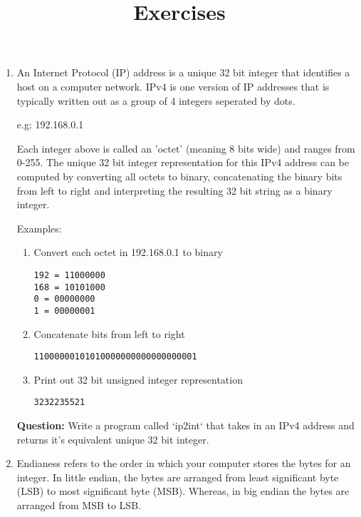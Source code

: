 \documentclass{article}
\title{Exercises \vspace{-4ex}}
\date{}
\begin{document}
\maketitle
\begin{enumerate}
  \item An Internet Protocol (IP) address is a unique 32 bit integer that identifies a
        host on a computer network. IPv4 is one version of IP addresses that is
        typically written out as a group of 4 integers seperated by dots.

        e.g: 192.168.0.1

        Each integer above is called an 'octet' (meaning 8 bits wide) and ranges from
        0-255. The unique 32 bit integer representation for this IPv4 address can be
        computed by converting all octets to binary, concatenating the binary bits from
        left to right and interpreting the resulting 32 bit string as a binary integer.

        Examples:
        \begin{enumerate}
          \item Convert each octet in 192.168.0.1 to binary
                \begin{verbatim}
192 = 11000000 
168 = 10101000 
0 = 00000000 
1 = 00000001
        \end{verbatim}

          \item Concatenate bits from left to right

                \begin{verbatim}
11000000101010000000000000000001        
        \end{verbatim}

          \item Print out 32 bit unsigned integer representation
                \begin{verbatim}
3232235521
\end{verbatim}

        \end{enumerate}

        \textbf{Question:} Write a program called `ip2int` that takes in an IPv4 address and returns
        it's equivalent unique 32 bit integer.

  \item Endianess refers to the order in which your computer stores the bytes for an
        integer. In little endian, the bytes are arranged from least significant byte
        (LSB) to most significant byte (MSB). Whereas, in big endian the bytes are
        arranged from MSB to LSB.


\end{enumerate}
\end{document}
